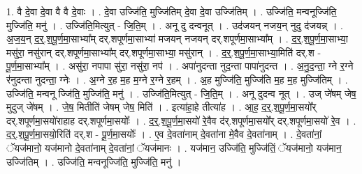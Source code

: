 \documentclass[17pt]{extarticle}
\begin{document}
1. वै दे॒वा दे॒वा वै वै दे॒वाः । . दे॒वा उज्जि॑ति॒ मुज्जि॑तिम् दे॒वा दे॒वा उज्जि॑तिम् । . उज्जि॑ति॒ मन्वनूज्जि॑ति॒ मुज्जि॑ति॒ मनु॑ । . उज्जि॑ति॒मित्युत् - जि॒ति॒म् । . अनू दु दन्वनूत् । . उद॑जयन् नजय॒न् नुदु द॑जयन्न् । . अ॒ज॒य॒न् द॒र्॒.श॒पू॒र्ण॒मा॒साभ्या᳚म् दर्.शपूर्णमा॒साभ्या॑ मजयन् नजयन् दर्.शपूर्णमा॒साभ्या᳚म् । . द॒र्॒.श॒पू॒र्ण॒मा॒साभ्या॒ मसु॑रा॒ नसु॑रान् दर्.शपूर्णमा॒साभ्या᳚म् दर्.शपूर्णमा॒साभ्या॒ मसु॑रान् । . द॒र्॒.श॒पू॒र्ण॒मा॒साभ्या॒मिति॑ दर्.श - पू॒र्ण॒मा॒साभ्या᳚म् । . असु॑रा॒ नपापा सु॑रा॒ नसु॑रा॒ नप॑ । . अपा॑नुदन्ता नुद॒न्ता पापा॑नुदन्त । . अ॒नु॒द॒न्ता॒ ग्ने र॒ग्ने र॑नुदन्ता नुदन्ता॒ ग्नेः । . अ॒ग्ने र॒ह म॒ह म॒ग्ने र॒ग्ने र॒हम् । . अ॒ह मुज्जि॑ति॒ मुज्जि॑ति म॒ह म॒ह मुज्जि॑तिम् । . उज्जि॑ति॒ मन्वनू ज्जि॑ति॒ मुज्जि॑ति॒ मनु॑ । . उज्जि॑ति॒मित्युत् - जि॒ति॒म् । . अनू दुदन्व नूत् । . उज् जे॑षम् जेष॒ मुदुज् जे॑षम् । . जे॒ष॒ मितीति॑ जेषम् जेष॒ मिति॑ । . इत्या॑हा॒हे तीत्या॑ह । . आ॒ह॒ द॒र्॒.श॒पू॒र्ण॒मा॒सयो᳚र् दर्.शपूर्णमा॒सयो॑राहाह दर्.शपूर्णमा॒सयोः᳚ । . द॒र्॒.श॒पू॒र्ण॒मा॒सयो॑ रे॒वैव द॑र्.शपूर्णमा॒सयो᳚र् दर्.शपूर्णमा॒सयो॑ रे॒व । . द॒र्॒.श॒पू॒र्ण॒मा॒सयो॒रिति॑ दर्.श - पू॒र्ण॒मा॒सयोः᳚ । . ए॒व दे॒वता॑नाम् दे॒वता॑ना मे॒वैव दे॒वता॑नाम् । . दे॒वता॑नां॒ ॅयज॑मानो॒ यज॑मानो दे॒वता॑नाम् दे॒वता॑नां॒ ॅयज॑मानः । . यज॑मान॒ उज्जि॑ति॒ मुज्जि॑तिं॒ ॅयज॑मानो॒ यज॑मान॒ उज्जि॑तिम् । . उज्जि॑ति॒ मन्वनूज्जि॑ति॒ मुज्जि॑ति॒ मनु॑ । \newline
\end{document}
